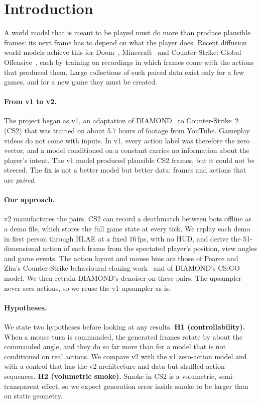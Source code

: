 \section{Introduction}
\label{sec:intro}
A world model that is meant to be played must do more than produce plausible frames: its next frame has to depend on what the player does.
Recent diffusion world models achieve this for Doom~\cite{valevski2025gamengen}, Minecraft~\cite{oasis2024,guo2025mineworld} and
Counter-Strike: Global Offensive~\cite{alonso2024diamond}, each by training on recordings in which frames come with the actions that produced them.
Large collections of such paired data exist only for a few games, and for a new game they must be created.

\paragraph{From v1 to v2.}
The project began as v1, an adaptation of DIAMOND~\cite{alonso2024diamond} to Counter-Strike~2 (CS2) that was trained on about 5.7 hours of footage from YouTube.
Gameplay videos do not come with inputs.
In v1, every action label was therefore the zero vector, and a model conditioned on a constant carries no information about the player's intent.
The v1 model produced plausible CS2 frames, but it could not be steered.
The fix is not a better model but better data: frames and actions that are \emph{paired}.

\paragraph{Our approach.}
v2 manufactures the pairs.
CS2 can record a deathmatch between bots offline as a demo file, which stores the full game state at every tick.
We replay each demo in first person through HLAE at a fixed 16\,fps, with no HUD, and derive the 51-dimensional action of each frame from the spectated player's position, view angles and game events.
The action layout and mouse bins are those of Pearce and Zhu's Counter-Strike behavioural-cloning work~\cite{pearce2021counterstrike} and of DIAMOND's CS:GO model.
We then retrain DIAMOND's denoiser on these pairs.
The upsampler never sees actions, so we reuse the v1 upsampler as is.

\paragraph{Hypotheses.}
We state two hypotheses before looking at any results.
\textbf{H1 (controllability).} When a mouse turn is commanded, the generated frames rotate by about the commanded angle, and they do so far more than for a model that is not conditioned on real actions.
We compare v2 with the v1 zero-action model and with a control that has the v2 architecture and data but shuffled action sequences.
\textbf{H2 (volumetric smoke).} Smoke in CS2 is a volumetric, semi-transparent effect, so we expect generation error inside smoke to be larger than on static geometry.

